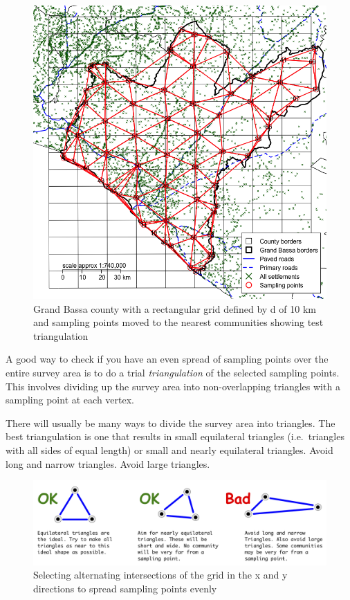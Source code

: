 \documentclass[12pt,a4paper]{book}
\theoremstyle{definition}
\theoremstyle{definition}
\theoremstyle{definition}
\theoremstyle{remark}
\begin{document}
\begin{figure}[H]

{\centering \includegraphics{figures/grid4a-1} 

}

\caption{Grand Bassa county with a rectangular grid defined by d of 10 km and sampling points moved to the nearest communities showing test triangulation}\label{fig:grid4a}
\end{figure}

A good way to check if you have an even spread of sampling points over
the entire survey area is to do a trial \emph{triangulation} of the
selected sampling points. This involves dividing up the survey area into
non-overlapping triangles with a sampling point at each vertex.

There will usually be many ways to divide the survey area into
triangles. The best triangulation is one that results in small
equilateral triangles (i.e.~triangles with all sides of equal length) or
small and nearly equilateral triangles. Avoid long and narrow triangles.
Avoid large triangles.

\begin{figure}[H]

{\centering \includegraphics[width=23.97in]{figures/grid3a} 

}

\caption{Selecting alternating intersections of the grid in the x and y directions to spread sampling points evenly}\label{fig:grid3b}
\end{figure}
\end{document}
